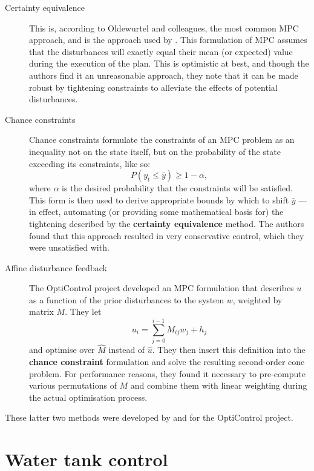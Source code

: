 \begin{description}
   \item[Certainty equivalence]
      This is, according to Oldewurtel and colleagues, the most common MPC approach, and is the approach used by .
      This formulation of MPC assumes that the disturbances will exactly equal their mean (or expected) value during the execution of the plan.
      This is optimistic at best, and though the authors find it an unreasonable approach, they note that it can be made robust by tightening constraints to alleviate the effects of potential disturbances.

   \item[Chance constraints]
      Chance constraints formulate the constraints of an MPC problem as an inequality not on the state itself, but on the probability of the state exceeding its constraints, like so:
      $$ P(y_t \leq \bar{y}) \geq 1 - \alpha, $$
      where $\alpha$ is the desired probability that the constraints will be satisfied.
      This form is then used to derive appropriate bounds by which to shift $\bar{y}$ --- in effect, automating (or providing some mathematical basis for) the tightening described by the {\bf certainty equivalence} method.
      The authors found that this approach resulted in very conservative control, which they were unsatisfied with.

   \item[Affine disturbance feedback]
      The OptiControl project developed an MPC formulation that describes $u$ as a function of the prior disturbances to the system $w$, weighted by matrix $M$.
      They let
      $$ u_i = \sum _{j=0} ^{i-1} M_{ij} w_j + h_j $$
      and optimise over $\hat{M}$ instead of $\hat{u}$.
      They then insert this definition into the {\bf chance constraint} formulation and solve the resulting second-order cone problem.
      For performance reasons, they found it necessary to pre-compute various permutations of $M$ and combine them with linear weighting during the actual optimisation process.
\end{description}

These latter two methods were developed by and for the OptiControl project.

\section{Water tank control}


